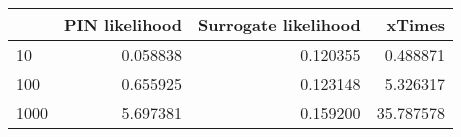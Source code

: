\begin{tabular}{lrrr}
\toprule
{} &  PIN likelihood &  Surrogate likelihood &     xTimes \\
\midrule
10   &        0.058838 &              0.120355 &   0.488871 \\
100  &        0.655925 &              0.123148 &   5.326317 \\
1000 &        5.697381 &              0.159200 &  35.787578 \\
\bottomrule
\end{tabular}
